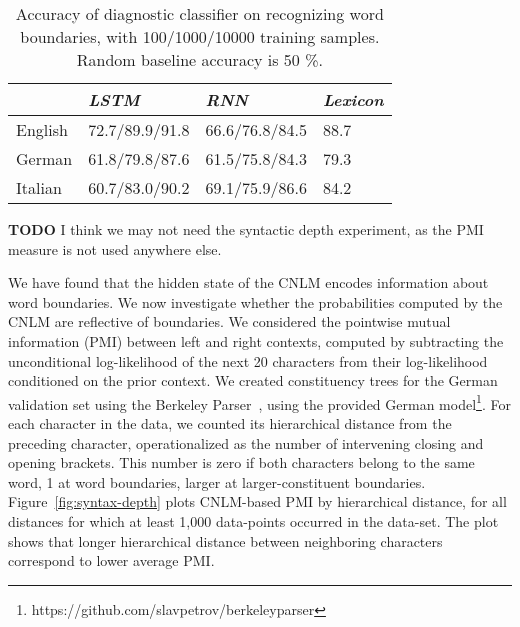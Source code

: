 \begin{table}[t]
	\small
  \begin{center}
    \begin{tabular}{l|l|l|l}
      \multicolumn{1}{c|}{}&\emph{LSTM}&\emph{RNN}&\emph{Lexicon}\\
      \hline
      English & 72.7/89.9/91.8 &  66.6/76.8/84.5  &  88.7   \\ 
      German & 61.8/79.8/87.6  &  61.5/75.8/84.3 &  79.3  \\ 
      Italian &  60.7/83.0/90.2 &  69.1/75.9/86.6  &  84.2   \\ 
    \end{tabular}
  \end{center}
  \caption{\label{tab:segmentation-results} Accuracy of diagnostic classifier on recognizing word boundaries, with 100/1000/10000 training samples. Random baseline accuracy is 50 \%.}
\end{table}


\textbf{TODO} I think we may not need the syntactic depth experiment, as the PMI measure is not used anywhere else.

We have found that the hidden state of the CNLM encodes information about word boundaries.
We now investigate whether the probabilities computed by the CNLM are reflective of boundaries.
We considered the pointwise mutual
information (PMI) between left and right contexts, computed by
subtracting the unconditional log-likelihood of the next 20 characters
from their log-likelihood conditioned on the prior context.
We created constituency trees for the German
validation set using the Berkeley Parser~\cite{petrov2007improved}, using the provided German model\footnote{https://github.com/slavpetrov/berkeleyparser}.
For each character in the data, we counted its hierarchical distance
from the preceding character, operationalized as the number of
intervening closing and opening brackets.  This number is zero if both characters belong to the same word, 1 at word
boundaries, larger at larger-constituent boundaries. Figure~\ref{fig:syntax-depth} plots CNLM-based PMI by
hierarchical distance, for all distances for which at least 1,000
data-points occurred in the data-set.  The plot shows that longer
hierarchical distance between neighboring characters correspond to
lower average PMI.


